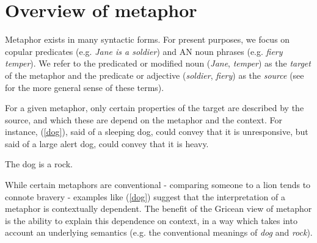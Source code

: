 \documentclass[OpenMind]{stjour}
\begin{document}
\section{Overview of metaphor}

	Metaphor exists in many syntactic forms.
	For present purposes, we focus on copular predicates (e.g. \emph{Jane is a soldier}) and AN noun phrases (e.g. \emph{fiery temper}). We refer to the predicated or modified noun (\emph{Jane}, \emph{temper}) as the \emph{target} of the metaphor and the predicate or adjective (\emph{soldier}, \emph{fiery}) as the \emph{source} (see \citep{lakoff1980metaphors} for the more general sense of these terms).


	For a given metaphor, only certain properties of the target are described by the source, and which these are depend on the metaphor and the context. For instance, (\ref{dog}), said of a sleeping dog, could convey that it is unresponsive, but said of a large alert dog, could convey that it is heavy.

	\begin{exe}
	\ex The dog is a rock. \label{dog}
	\end{exe}

	While certain metaphors are conventional - comparing someone to a lion tends to connote bravery - examples like (\ref{dog}) suggest that the interpretation of a metaphor is contextually dependent. The benefit of the Gricean view of metaphor is the ability to explain this dependence on context, in a way which takes into account an underlying semantics (e.g. the conventional meanings of \emph{dog} and \emph{rock}).
	
\end{document}
